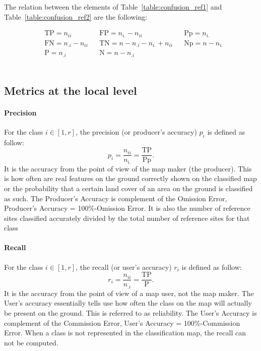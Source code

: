 The relation between the elements of Table~\ref{table:confusion_ref1} and Table~\ref{table:confusion_ref2} are the following:

\begin{equation}
\begin{aligned}
& \text{TP}=n_{ii} & 
& \text{FP}=n_{i.}-n_{ii} & 
& \text{Pp}=n_{i.} \\
& \text{FN}=n_{.i}-n_{ii} & 
& \text{TN}=n-n_{.i}-n_{i.}+n_{ii} & 
& \text{Np}=n-n_{i.}\\
& \text{P}=n_{.i} & 
& \text{N}=n-n_{.i} & 
\end{aligned}
\label{eq:relation_matrix}
\end{equation}\\

\subsection{Metrics at the local level}
\paragraph{Precision \\}
For the class $i \in [1,r]$, the precision (or producer's accuracy) $p_{i}$ is defined as follow:
\begin{equation}
p_{i}=\frac{n_{ii}}{n_{i.}}=\frac{\text{TP}}{\text{Pp}}.
\end{equation}
It is the accuracy from the point of view of the map maker (the producer). This is how often are real features on the ground correctly shown on the classified map or the probability that a certain land cover of an area on the ground is classified as such. The Producer's Accuracy is complement of the Omission Error, Producer's Accuracy = 100\%-Omission Error. It is also the number of reference sites classified accurately divided by the total number of reference sites for that class

\paragraph{Recall \\}
For the class $i \in [1,r]$, the recall (or user's accuracy) $r_{i}$ is defined as follow:
\begin{equation}
r_{i}=\frac{n_{ii}}{n_{.i}}=\frac{\text{TP}}{\text{P}}.
\end{equation}
It is the accuracy from the point of view of a map user, not the map maker. The User's accuracy essentially tells use how often the class on the map will actually be present on the ground. This is referred to as reliability. The User's Accuracy is complement of the Commission Error, User's Accuracy = 100\%-Commission Error. When a class is not represented in the classification map, the recall can not be computed.

